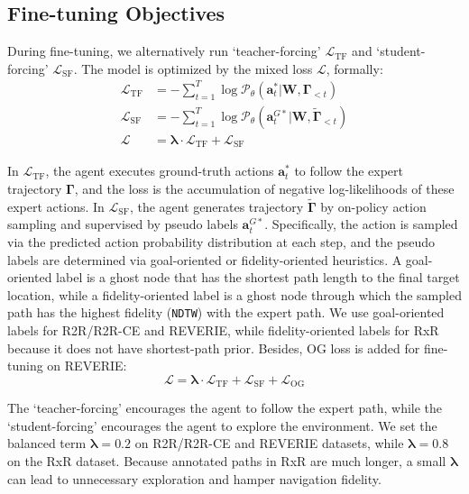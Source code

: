 \subsection{Fine-tuning Objectives}
During fine-tuning, we alternatively run `teacher-forcing' $\mathcal{L}_{\mathrm{TF}}$ and `student-forcing' $\mathcal{L}_{\mathrm{SF}}$. The model is optimized by the mixed loss $\mathcal{L}$, formally:
{\small
\begin{equation}\label{eq:ts_r2r}
\begin{aligned}
\mathcal{L}_{\textrm{TF}} &= -\sum\nolimits_{t=1}^T \log \mathcal{P}_{\theta} (\mathbf{a}_{t}^{*} | \mathbf{W}, \mathbf{\Gamma}_{< t}) \\
\mathcal{L}_{\textrm{SF}} &= -\sum\nolimits_{t=1}^T \log \mathcal{P}_{\theta} (\mathbf{a}_{t}^{G*} | \mathbf{W}, \widetilde{\mathbf{\Gamma}}_{< t}) \\
\mathcal{L} &= \mathbf{\lambda} \cdot \mathcal{L}_{\textrm{TF}} + \mathcal{L}_{\textrm{SF}}
\end{aligned}
\end{equation}
}

In $\mathcal{L}_{\textrm{TF}}$, the agent executes ground-truth actions $\mathbf{a}_{t}^{*}$ to follow the expert trajectory $\mathbf{\Gamma}$, and the loss is the accumulation of negative log-likelihoods of these expert actions.
In $\mathcal{L}_{\textrm{SF}}$, the agent generates trajectory $\tilde{\mathbf{\Gamma}}$ by on-policy action sampling and supervised by pseudo labels $\mathbf{a}_{t}^{G*}$.
Specifically, the action is sampled via the predicted action probability distribution at each step, and the pseudo labels are determined via goal-oriented or fidelity-oriented heuristics. 
A goal-oriented label is a ghost node that has the shortest path length to the final target location, while a fidelity-oriented label is a ghost node through which the sampled path has the highest fidelity (\texttt{NDTW}) with the expert path.
We use goal-oriented labels for R2R/R2R-CE and REVERIE, while fidelity-oriented labels for RxR because it does not have shortest-path prior.
Besides, OG loss is added for fine-tuning on REVERIE:
{\small
\begin{equation}\label{eq:ts_reverie}
\mathcal{L} = \mathbf{\lambda} \cdot \mathcal{L}_{\textrm{TF}} + \mathcal{L}_{\textrm{SF}} + \mathcal{L}_{\textrm{OG}}
\end{equation}
}

The `teacher-forcing' encourages the agent to follow the expert path, while the `student-forcing' encourages the agent to explore the environment. 
We set the balanced term $\mathbf{\lambda}=0.2$ on R2R/R2R-CE and REVERIE datasets, while $\mathbf{\lambda}=0.8$ on the RxR dataset. Because annotated paths in RxR are much longer, a small $\mathbf{\lambda}$ can lead to unnecessary exploration and hamper navigation fidelity.


